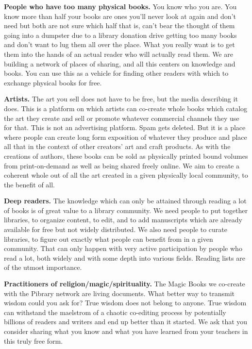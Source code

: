 \textbf{People who have too many physical books.} You know who you are.
You know more than half your books are ones you'll never look at again
and don't need but both are not sure which half that is, can't bear the
thought of them going into a dumpster due to a library donation drive
getting too many books and don't want to lug them all over the place.
What you really want is to get them into the hands of an actual reader
who will actually read them. We are building a network of places of
sharing, and all this centers on knowledge and books. You can use this
as a vehicle for finding other readers with which to exchange physical
books for free.

\textbf{Artists.} The art you sell does not have to be free, but the
media describing it does. This is a platform on which artists can
co-create whole books which catalog the art they create and sell or
promote whatever commercial channels they use for that. This is not an
advertising platform. Spam gets deleted. But it is a place where people
can create long form exposition of whatever they produce and place all
that in the context of other creators' art and craft products. As with
the creations of authors, these books can be sold as physically printed
bound volumes from print-on-demand as well as being shared freely
online. We aim to create a coherent whole out of all the art created in
a given physically local community, to the benefit of all.

\textbf{Deep readers.} The knowledge which can only be attained through
reading a lot of books is of great value to a library community. We need
people to put together libraries, to organize content, to edit, and to
add manuscripts which are already available for free but not widely
distributed. We also need people to curate libraries, to figure out
exactly what people can benefit from in a given community. That can only
happen with very active participation by people who read a lot, both
widely and with some depth into various fields. Reading lists are of the
utmost importance.

\textbf{Practitioners of religion/magic/spirituality.} The Magic Books
we co-create with the Pibrary network are living documents. What better
way to transmit wisdom could you ask for? True wisdom does not belong to
anyone. True wisdom can withstand the maelstrom of a chaotic co-editing
process by potentially billions of readers and writers and end up better
than it started. We ask that you consider sharing what you know and what
you have learned from your teachers in this truly free form.

